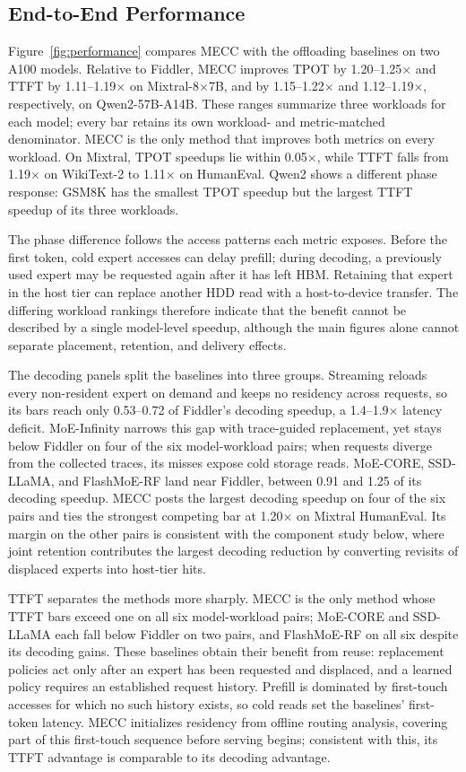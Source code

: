 \subsection{End-to-End Performance}
Figure~\ref{fig:performance} compares MECC with the offloading baselines on two A100 models.
Relative to Fiddler, MECC improves TPOT by 1.20--1.25$\times$ and TTFT by 1.11--1.19$\times$ on Mixtral-8$\times$7B, and by 1.15--1.22$\times$ and 1.12--1.19$\times$, respectively, on Qwen2-57B-A14B.
These ranges summarize three workloads for each model; every bar retains its own workload- and metric-matched denominator.
MECC is the only method that improves both metrics on every workload.
On Mixtral, TPOT speedups lie within 0.05$\times$, while TTFT falls from 1.19$\times$ on WikiText-2 to 1.11$\times$ on HumanEval.
Qwen2 shows a different phase response: GSM8K has the smallest TPOT speedup but the largest TTFT speedup of its three workloads.

The phase difference follows the access patterns each metric exposes.
Before the first token, cold expert accesses can delay prefill; during decoding, a previously used expert may be requested again after it has left HBM.
Retaining that expert in the host tier can replace another HDD read with a host-to-device transfer.
The differing workload rankings therefore indicate that the benefit cannot be described by a single model-level speedup, although the main figures alone cannot separate placement, retention, and delivery effects.

The decoding panels split the baselines into three groups.
Streaming reloads every non-resident expert on demand and keeps no residency across requests, so its bars reach only 0.53--0.72 of Fiddler's decoding speedup, a 1.4--1.9$\times$ latency deficit.
MoE-Infinity narrows this gap with trace-guided replacement, yet stays below Fiddler on four of the six model-workload pairs; when requests diverge from the collected traces, its misses expose cold storage reads.
MoE-CORE, SSD-LLaMA, and FlashMoE-RF land near Fiddler, between 0.91 and 1.25 of its decoding speedup.
MECC posts the largest decoding speedup on four of the six pairs and ties the strongest competing bar at 1.20$\times$ on Mixtral HumanEval.
Its margin on the other pairs is consistent with the component study below, where joint retention contributes the largest decoding reduction by converting revisits of displaced experts into host-tier hits.

TTFT separates the methods more sharply.
MECC is the only method whose TTFT bars exceed one on all six model-workload pairs; MoE-CORE and SSD-LLaMA each fall below Fiddler on two pairs, and FlashMoE-RF on all six despite its decoding gains.
These baselines obtain their benefit from reuse: replacement policies act only after an expert has been requested and displaced, and a learned policy requires an established request history.
Prefill is dominated by first-touch accesses for which no such history exists, so cold reads set the baselines' first-token latency.
MECC initializes residency from offline routing analysis, covering part of this first-touch sequence before serving begins; consistent with this, its TTFT advantage is comparable to its decoding advantage.

